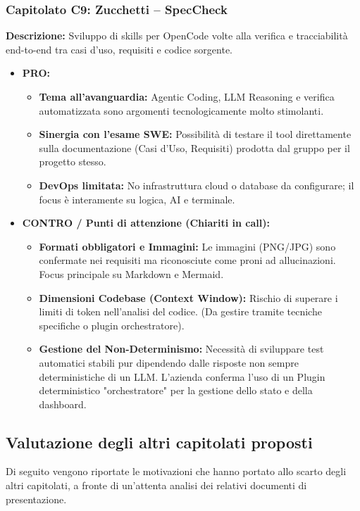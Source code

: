 \documentclass[a4paper, 11pt]{article}
\begin{document}
\subsubsection*{Capitolato C9: Zucchetti -- SpecCheck}
\textbf{Descrizione:} Sviluppo di skills per OpenCode volte alla verifica e tracciabilità end-to-end tra casi d'uso, requisiti e codice sorgente.
\begin{itemize}
    \item \textbf{PRO:}
    \begin{itemize}
        \item \textbf{Tema all'avanguardia:} Agentic Coding, LLM Reasoning e verifica automatizzata sono argomenti tecnologicamente molto stimolanti.
        \item \textbf{Sinergia con l'esame SWE:} Possibilità di testare il tool direttamente sulla documentazione (Casi d'Uso, Requisiti) prodotta dal gruppo per il progetto stesso.
        \item \textbf{DevOps limitata:} No infrastruttura cloud o database da configurare; il focus è interamente su logica, AI e terminale.
    \end{itemize}
    \item \textbf{CONTRO / Punti di attenzione (Chiariti in call):}
    \begin{itemize}
        \item \textbf{Formati obbligatori e Immagini:} Le immagini (PNG/JPG) sono confermate nei requisiti ma riconosciute come proni ad allucinazioni. Focus principale su Markdown e Mermaid.
        \item \textbf{Dimensioni Codebase (Context Window):} Rischio di superare i limiti di token nell'analisi del codice. (Da gestire tramite tecniche specifiche o plugin orchestratore).
        \item \textbf{Gestione del Non-Determinismo:} Necessità di sviluppare test automatici stabili pur dipendendo dalle risposte non sempre deterministiche di un LLM. L'azienda conferma l'uso di un Plugin deterministico "orchestratore" per la gestione dello stato e della dashboard.
    \end{itemize}
\end{itemize}

\subsection{Valutazione degli altri capitolati proposti}
Di seguito vengono riportate le motivazioni che hanno portato allo scarto degli altri capitolati, a fronte di un'attenta analisi dei relativi documenti di presentazione.
\end{document}
